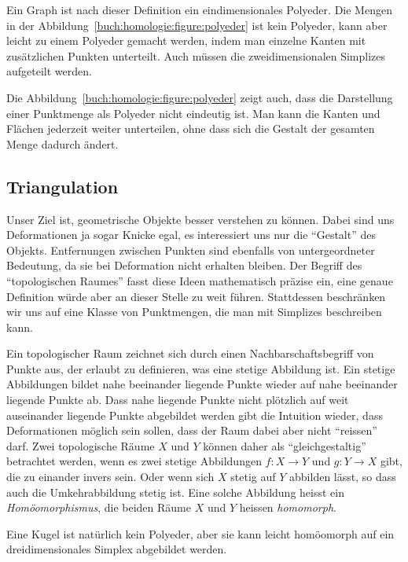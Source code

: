 Ein Graph ist nach dieser Definition ein eindimensionales Polyeder.
Die Mengen in der Abbildung~\ref{buch:homologie:figure:polyeder}
ist kein Polyeder, kann aber leicht zu einem Polyeder gemacht werden,
indem man einzelne Kanten mit zusätzlichen Punkten unterteilt.
Auch müssen die zweidimensionalen Simplizes aufgeteilt werden.

Die Abbildung~\ref{buch:homologie:figure:polyeder} zeigt auch, dass
die Darstellung einer Punktmenge als Polyeder nicht eindeutig ist.
Man kann die Kanten und Flächen jederzeit weiter unterteilen, ohne
dass sich die Gestalt der gesamten Menge dadurch ändert.

\subsection{Triangulation
\label{buch:subsection:triangulation}}
Unser Ziel ist, geometrische Objekte besser verstehen zu können.
Dabei sind uns Deformationen ja sogar Knicke egal, es interessiert uns
nur die ``Gestalt'' des Objekts.
Entfernungen zwischen Punkten sind ebenfalls von untergeordneter 
Bedeutung, da sie bei Deformation nicht erhalten bleiben.
Der Begriff des ``topologischen Raumes'' fasst diese Ideen mathematisch
präzise ein, eine genaue Definition würde aber an dieser Stelle zu weit
führen.
Stattdessen beschränken wir uns auf eine Klasse von Punktmengen, die man
mit Simplizes beschreiben kann.

Ein topologischer Raum zeichnet sich durch einen Nachbarschaftsbegriff
von Punkte aus, der erlaubt zu definieren, was eine stetige Abbildung ist.
Ein stetige Abbildungen bildet nahe beeinander liegende Punkte wieder
auf nahe beeinander liegende Punkte ab.
Dass nahe liegende Punkte nicht plötzlich auf weit auseinander liegende
Punkte abgebildet werden gibt die Intuition wieder, dass Deformationen
möglich sein sollen, dass der Raum dabei aber nicht ``reissen'' darf.
Zwei topologische Räume $X$ und $Y$ können daher als ``gleichgestaltig''
betrachtet werden, wenn es zwei stetige Abbildungen $f\colon X\to Y$
und $g\colon Y\to X$ gibt, die zu einander invers sein.
Oder wenn sich $X$ stetig auf $Y$ abbilden lässt, so dass auch die
Umkehrabbildung stetig ist.
Eine solche Abbildung heisst ein {\em Homöomorphismus}, die beiden Räume
$X$ und $Y$ heissen {\em homomorph}.

Eine Kugel ist natürlich kein Polyeder, aber sie kann leicht homöomorph
auf ein dreidimensionales Simplex abgebildet werden.

